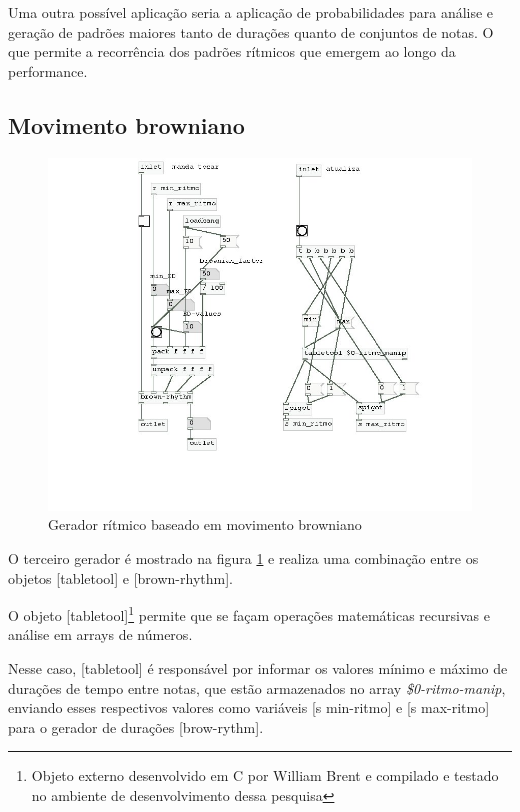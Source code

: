 \documentclass{ppgmus}
\begin{document}
Uma outra possível aplicação seria a aplicação de probabilidades para
análise e geração de padrões maiores tanto de durações quanto de conjuntos
de notas. O que permite a recorrência dos padrões
rítmicos que emergem ao longo da performance.




\subsection{Movimento browniano}


\begin{figure}
\includegraphics[scale=.6]{gerador-ritmico2}
\caption{Gerador rítmico baseado em movimento browniano}
\label{gera-ritmico2}
\end{figure}  


O terceiro gerador é mostrado na figura \ref{gera-ritmico2} e
realiza uma combinação entre os objetos [tabletool] e [brown-rhythm].

O objeto [tabletool]\footnote{Objeto externo desenvolvido em C
por William Brent e compilado e testado no ambiente de desenvolvimento
dessa pesquisa} permite que se façam operações matemáticas
recursivas e análise em arrays de números. 

Nesse caso, [tabletool] é responsável por informar os valores
mínimo e máximo de durações de tempo entre notas, que estão
armazenados no array \textit{\$0-ritmo-manip}, enviando
esses respectivos valores como variáveis [s min-ritmo] e 
[s max-ritmo] para o gerador de durações [brow-rythm].
\end{document}
